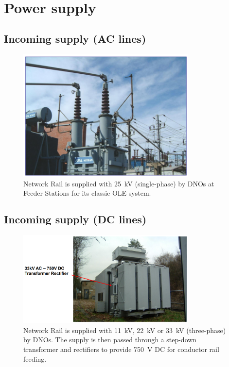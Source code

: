 \section{Power supply}
\subsection{Incoming supply (AC lines)}
\begin{figure}[H]
    \centering
    \includegraphics[width = 0.8\textwidth]{img/figure117.png}
    \caption{Network Rail is supplied with \SI{25}{\kilo\volt} (single-phase) by DNOs at Feeder Stations for its classic OLE system.}
\end{figure}
\subsection{Incoming supply (DC lines)}
\begin{figure}[H]
    \centering
    \includegraphics[width = 0.8\textwidth]{img/figure118.png}
    \caption{Network Rail is supplied with \SI{11}{\kilo\volt}, \SI{22}{\kilo\volt} or \SI{33}{\kilo\volt} (three-phase) by DNOs. The supply is then passed through a step-down transformer and rectifiers to provide \SI{750}{\volt} DC for conductor rail feeding.}
\end{figure}
